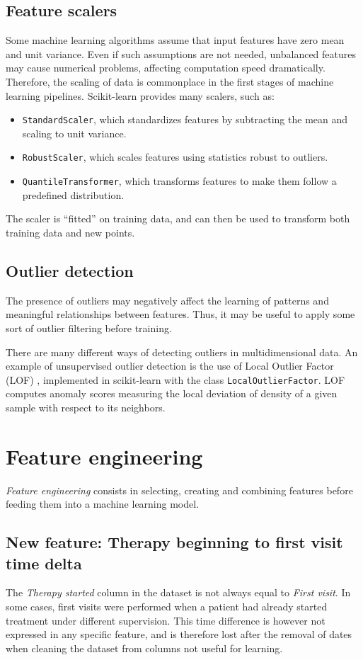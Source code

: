\documentclass[12pt]{report}
\begin{document}
\subsection*{Feature scalers}
Some machine learning algorithms assume that input features have zero mean and unit variance. Even if such assumptions are not needed, unbalanced features may cause numerical problems, affecting computation speed dramatically. Therefore, the scaling of data is commonplace in the first stages of machine learning pipelines. Scikit-learn provides many scalers, such as:
\begin{itemize}
\item \texttt{StandardScaler}, which standardizes features by subtracting the mean and scaling to unit variance.
\item \texttt{RobustScaler}, which scales features using statistics robust to outliers.
\item \texttt{QuantileTransformer}, which transforms features to make them follow a predefined distribution.
\end{itemize}
The scaler is ``fitted'' on training data, and can then be used to transform both training data and new points.

\subsection*{Outlier detection}
The presence of outliers may negatively affect the learning of patterns and meaningful relationships between features. Thus, it may be useful to apply some sort of outlier filtering before training.

There are many different ways of detecting outliers in multidimensional data. An example of unsupervised outlier detection is the use of Local Outlier Factor (LOF) \cite{breunig00}, implemented in scikit-learn with the class \texttt{LocalOutlierFactor}. LOF computes anomaly scores measuring the local deviation of density of a given sample with respect to its neighbors.

\section{Feature engineering}
\textit{Feature engineering} consists in selecting, creating and combining features before feeding them into a machine learning model.

\subsection*{New feature: Therapy beginning to first visit time delta}
The \textit{Therapy started} column in the dataset is not always equal to \textit{First visit}. In some cases, first visits were performed when a patient had already started treatment under different supervision. This time difference is however not expressed in any specific feature, and is therefore lost after the removal of dates when cleaning the dataset from columns not useful for learning.
\end{document}
